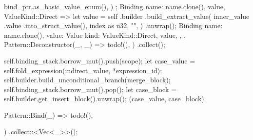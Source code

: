 \documentclass[
  oneside,
  english,
  coorientadorbanca,
  noabntexcite
]{ufsc-thesis-rn46-2019}
\begin{document}
\begin{rustcode}
{{{{{{{{{{{{{                                                                bind_ptr.as_basic_value_enum(),
                                                            )
                                                        };
                                                        Binding {
                                                            name: name.clone(),
                                                            value,
                                                        }
                                                    }
                                                    ValueKind::Direct => {
                                                        let value = self
                                                            .builder
                                                            .build_extract_value(
                                                                inner_value
                                                                    .value
                                                                    .into_struct_value(),
                                                                index as u32,
                                                                "",
                                                            )
                                                            .unwrap();
                                                        Binding {
                                                            name: name.clone(),
                                                            value: Value {
                                                                kind: ValueKind::Direct,
                                                                value,
                                                            },
                                                        }
                                                    }
                                                },
                                                Pattern::Deconstructor(_, _) => todo!(),
                                            }
                                        })
                                        .collect();

                                    self.binding_stack.borrow_mut().push(scope);
                                    let case_value =
                                        self.fold_expression(indirect_value, *expression_id);
                                    self.builder.build_unconditional_branch(merge_block);
                                    self.binding_stack.borrow_mut().pop();
                                    let case_block = self.builder.get_insert_block().unwrap();
                                    (case_value, case_block)
                                }
                            }
                            Pattern::Bind(_) => todo!(),
                        }
                    })
                    .collect::<Vec<_>>();

}}}}
\end{rustcode}
\end{document}
